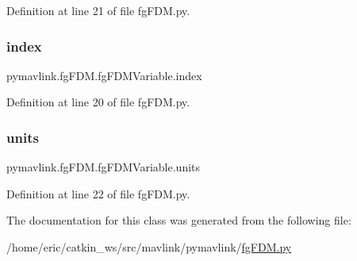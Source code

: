 Definition at line 21 of file fg\+F\+D\+M.\+py.

\mbox{\label{classpymavlink_1_1fgFDM_1_1fgFDMVariable_a700fa75ac67b10effc7ff492ec16972e}} 
\subsubsection{\texorpdfstring{index}{index}}
{\footnotesize\ttfamily pymavlink.\+fg\+F\+D\+M.\+fg\+F\+D\+M\+Variable.\+index}



Definition at line 20 of file fg\+F\+D\+M.\+py.

\mbox{\label{classpymavlink_1_1fgFDM_1_1fgFDMVariable_a7c4d651947e6e5c81957da2c277d080f}} 
\subsubsection{\texorpdfstring{units}{units}}
{\footnotesize\ttfamily pymavlink.\+fg\+F\+D\+M.\+fg\+F\+D\+M\+Variable.\+units}



Definition at line 22 of file fg\+F\+D\+M.\+py.



The documentation for this class was generated from the following file\+:\begin{DoxyCompactItemize}
\item 
/home/eric/catkin\+\_\+ws/src/mavlink/pymavlink/\mbox{\hyperlink{fgFDM_8py}{fg\+F\+D\+M.\+py}}\end{DoxyCompactItemize}
